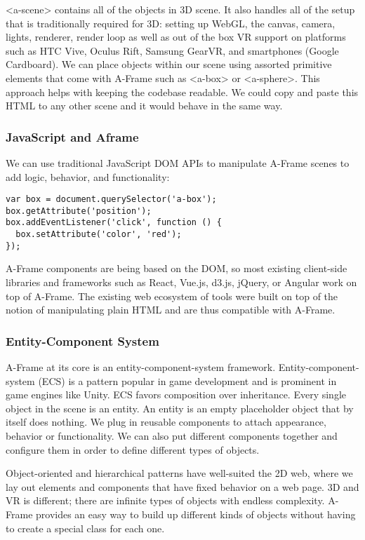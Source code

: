 <a-scene> contains all of the objects in 3D scene. It also handles all of the setup that is traditionally required for 3D: setting up WebGL, the canvas, camera, lights, renderer, render loop as well as out of the box VR support on platforms such as HTC Vive, Oculus Rift, Samsung GearVR, and smartphones (Google Cardboard). We can place objects within our scene using assorted primitive elements that come with A-Frame such as <a-box> or <a-sphere>. This approach helps with keeping the codebase readable. We could copy and paste this HTML to any other scene and it would behave in the same way. \cite{aframe-intro}

\subsubsection{JavaScript and Aframe}
We can use traditional JavaScript DOM APIs to manipulate A-Frame scenes to add logic, behavior, and functionality:

\begin{lstlisting}[frame=single]
var box = document.querySelector('a-box');
box.getAttribute('position');
box.addEventListener('click', function () {
  box.setAttribute('color', 'red');
});
\end{lstlisting}

A-Frame components are being based on the DOM, so most existing client-side libraries and frameworks such as React, Vue.js, d3.js, jQuery, or Angular work on top of A-Frame. The existing web ecosystem of tools were built on top of the notion of manipulating plain HTML and are thus compatible with A-Frame. \cite{aframe-intro}

\subsubsection{Entity-Component System}
A-Frame at its core is an entity-component-system framework. Entity-component-system (ECS) is a pattern popular in game development and is prominent in game engines like Unity. ECS favors composition over inheritance. Every single object in the scene is an entity. An entity is an empty placeholder object that by itself does nothing. We plug in reusable components to attach appearance, behavior or functionality. We can also put different components together and configure them in order to define different types of objects. \cite{aframe-intro}

Object-oriented and hierarchical patterns have well-suited the 2D web, where we lay out elements and components that have fixed behavior on a web page. 3D and VR is different; there are infinite types of objects with endless complexity. A-Frame provides an easy way to build up different kinds of objects without having to create a special class for each one. \cite{aframe-intro}

